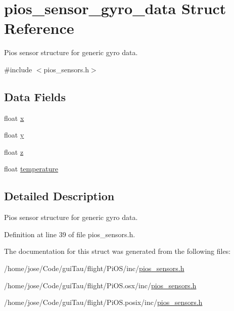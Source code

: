 \hypertarget{structpios__sensor__gyro__data}{\section{pios\-\_\-sensor\-\_\-gyro\-\_\-data Struct Reference}
\label{structpios__sensor__gyro__data}
}


Pios sensor structure for generic gyro data.  




{\ttfamily \#include $<$pios\-\_\-sensors.\-h$>$}

\subsection*{Data Fields}
\begin{DoxyCompactItemize}
\item 
float \hyperlink{group___p_i_o_s___s_e_n_s_o_r_s_gaa3675ec6a2d0ed4f805311fef19c0c8b}{x}
\item 
float \hyperlink{group___p_i_o_s___s_e_n_s_o_r_s_gaad82a3c1fcca51db61c84eb792d19842}{y}
\item 
float \hyperlink{group___p_i_o_s___s_e_n_s_o_r_s_ga54e998de17a4da6aa1f8504cce31a31c}{z}
\item 
float \hyperlink{group___p_i_o_s___s_e_n_s_o_r_s_ga9f44abb5eea58728c07c17a58155f6e8}{temperature}
\end{DoxyCompactItemize}


\subsection{Detailed Description}
Pios sensor structure for generic gyro data. 

Definition at line 39 of file pios\-\_\-sensors.\-h.



The documentation for this struct was generated from the following files\-:\begin{DoxyCompactItemize}
\item 
/home/jose/\-Code/gui\-Tau/flight/\-Pi\-O\-S/inc/\hyperlink{inc_2pios__sensors_8h}{pios\-\_\-sensors.\-h}\item 
/home/jose/\-Code/gui\-Tau/flight/\-Pi\-O\-S.\-osx/inc/\hyperlink{osx_2inc_2pios__sensors_8h}{pios\-\_\-sensors.\-h}\item 
/home/jose/\-Code/gui\-Tau/flight/\-Pi\-O\-S.\-posix/inc/\hyperlink{posix_2inc_2pios__sensors_8h}{pios\-\_\-sensors.\-h}\end{DoxyCompactItemize}
